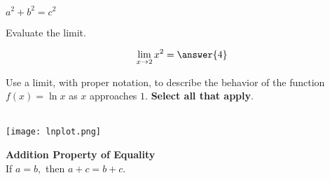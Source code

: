 \documentclass[handout]{ximera}
\begin{document}
\begin{definition}
    $a^2+b^2 = c^2$
\end{definition}    


\begin{exercise}
Evaluate the limit.

\[ \lim\limits_{x \to 2} x^2 = \answer{4} \]

\end{exercise}


\begin{question} Use a limit, with proper notation, to describe the behavior of the function $f(x)=\ln x$ as $x$ approaches $1.$  \textbf{Select all that apply}. \\ \\

    \begin{center} 
        \texttt{[image: lnplot.png]}
    \end{center}

\begin{selectAll}
    \end{selectAll}
    \end{question}

\begin{theorem}

\textbf{Addition Property of Equality} \\ 

If $ a = b,$ then $a + c = b + c$.
\end{theorem}
\end{document}

